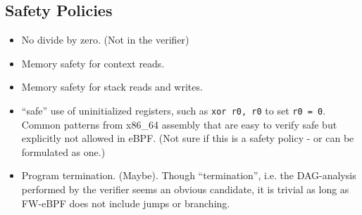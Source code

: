 \subsection{Safety Policies}
\label{subsec:safety_policies}

\begin{itemize}
\item No divide by zero. (Not in the verifier)
\item Memory safety for context reads.
\item Memory safety for stack reads and writes.
\item ``safe'' use of uninitialized registers, such as \texttt{xor r0, r0} to set \texttt{r0 = 0}. Common patterns from x86\_64 assembly that are easy to verify safe but explicitly not allowed in eBPF.
  (Not sure if this is a safety policy - or can be formulated as one.)
\item Program termination. (Maybe). \newline
  Though ``termination'', i.e. the DAG-analysis performed by the verifier seems an obvious candidate, it is trivial as long as FW-eBPF does not include jumps or branching.

\end{itemize}

